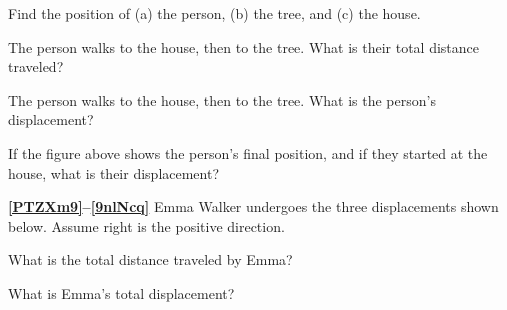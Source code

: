 \documentclass[../main.tex]{subfiles}
\begin{document}
\begin{exercise} \label{kE0eEH}
    Find the position of (a) the person, (b) the tree, and (c) the house.
\end{exercise}

\begin{exercise} \label{dOncsX}
    The person walks to the house, then to the tree. What is their total distance traveled?
\end{exercise}

\begin{exercise} \label{Ka0olk}
    The person walks to the house, then to the tree. What is the person's displacement?
\end{exercise}

\begin{exercise}
    If the figure above shows the person's final position, and if they started at the house, what is their displacement?
\end{exercise}

\cyanhrule

\vspace{1em}

\textbf{\ref{PTZXm9}--\ref{9nlNcq}} Emma Walker undergoes the three displacements shown below. Assume right is the positive direction.

\begin{center}
\end{center}

\begin{exercise} \label{PTZXm9}
    What is the total distance traveled by Emma?
\end{exercise}

\begin{exercise} \label{9nlNcq}
    What is Emma's total displacement?
\end{exercise}
\end{document}
